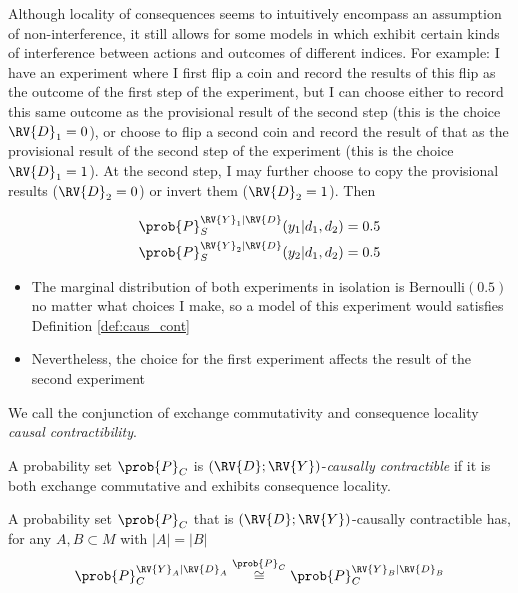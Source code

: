 Although locality of consequences seems to intuitively encompass an assumption of non-interference, it still allows for some models in which exhibit certain kinds of interference between actions and outcomes of different indices. For example: I have an experiment where I first flip a coin and record the results of this flip as the outcome of the first step of the experiment, but I can choose either to record this same outcome as the provisional result of the second step (this is the choice $\RV{D}_1=0$), or choose to flip a second coin and record the result of that as the provisional result of the second step of the experiment (this is the choice $\RV{D}_1=1$). At the second step, I may further choose to copy the provisional results ($\RV{D}_2=0$) or invert them ($\RV{D}_2=1$). Then

\begin{align}
    \prob{P}_S^{\RV{Y}_1|\RV{D}}(y_1|d_1,d_2) &= 0.5\\
    \prob{P}_S^{\RV{Y}_2|\RV{D}}(y_2|d_1,d_2) &= 0.5
\end{align}
\begin{itemize}
    \item The marginal distribution of both experiments in isolation is $\text{Bernoulli}(0.5)$ no matter what choices I make, so a model of this experiment would satisfies Definition \ref{def:caus_cont}
    \item Nevertheless, the choice for the first experiment affects the result of the second experiment
\end{itemize}

We call the conjunction of exchange commutativity and consequence locality \emph{causal contractibility}.

\begin{definition}
A probability set $\prob{P}_C$ is $(\RV{D};\RV{Y})$-\emph{causally contractible} if it is both exchange commutative and exhibits consequence locality.
\end{definition}

\begin{theorem}\label{th:equal_of_condits}
A probability set $\prob{P}_C$ that is $(\RV{D};\RV{Y})$-causally contractible has, for any $A,B\subset M$ with $|A|=|B|$
\begin{align}
    \prob{P}_C^{\RV{Y}_A|\RV{D}_A} \overset{\prob{P}_C}{\cong} \prob{P}_C^{\RV{Y}_B|\RV{D}_B}
\end{align}
\end{theorem}

